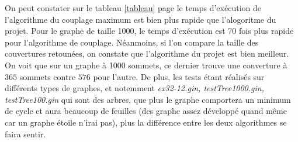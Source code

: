   On peut constater sur le tableau \ref{tableau} page \pageref{tableau}
  le temps d'exécution de l'algorithme du couplage maximum est bien plus
  rapide que l'alogoritme du projet. Pour le graphe de taille 1000, le
  temps d'exécution est $70$ fois plus rapide pour l'algorithme de
  couplage.\newline
  \indent Néanmoins, si l'on compare la taille des couvertures
  retounées, on constate que l'algorithme du projet est bien
  meilleur. On voit que sur un graphe à 1000 sommets, ce dernier trouve
  une converture à $365$ sommets contre $576$ pour l'autre. De plus, les
  tests étant réalisés sur différents types de graphes, et notemment
  \emph{ex32-12.gin, testTree1000.gin, testTree100.gin} qui sont des
  arbres, que plus le graphe comportera un minimum de cycle et aura
  beaucoup de feuilles (des graphe assez développé quand même car un
  graphe étoile n'irai pas), plus la différence entre les deux
  algorithmes se faira sentir.